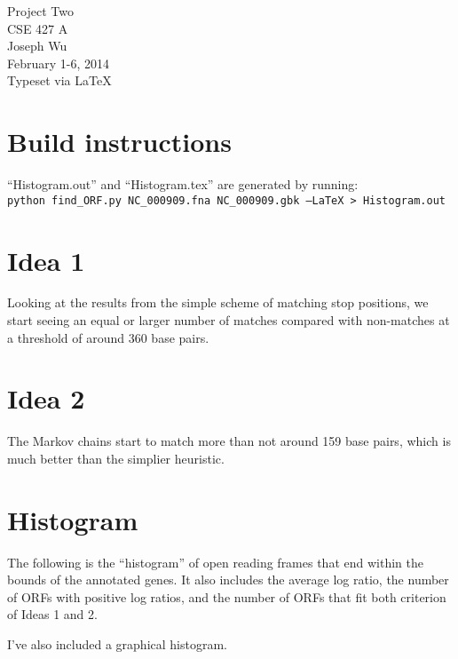 \documentclass[a4paper, 12pt]{report}
\begin{document}
    \begin{center}
        {\LARGE Project Two} \\
        CSE 427 A \\
        Joseph Wu  \\
        February 1-6, 2014 \\
        {\tiny Typeset via \LaTeX}
    \end{center}

\section{Build instructions}
    ``Histogram.out'' and ``Histogram.tex'' are generated by running: \\
    \texttt{python find\_ORF.py NC\_000909.fna NC\_000909.gbk --LaTeX > Histogram.out}

\section{Idea 1}
    Looking at the results from the simple scheme of matching stop positions, 
    we start seeing an equal or larger number of matches compared with non-matches 
        at a threshold of around 360 base pairs.
        
\section{Idea 2}
    The Markov chains start to match more than not around 159 base pairs,
        which is much better than the simplier heuristic.

\section{Histogram}
    The following is the ``histogram'' of open reading frames
    that end within the bounds of the annotated genes.
    It also includes the average log ratio,
        the number of ORFs with positive log ratios, 
        and the number of ORFs that fit both criterion of Ideas 1 and 2.

    I've also included a graphical histogram.
    
    
    
\end{document}
